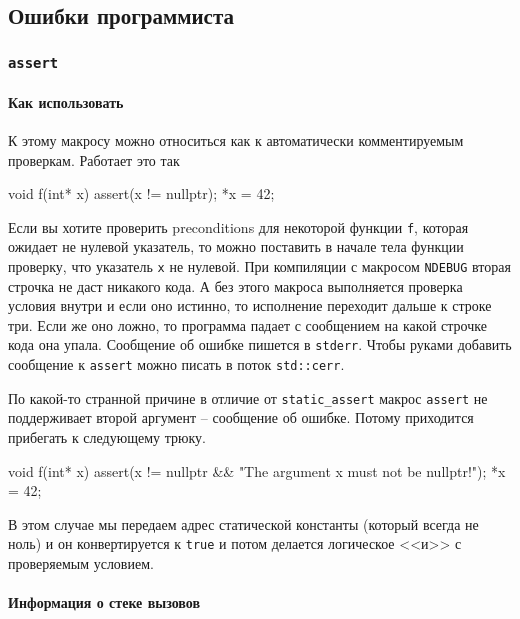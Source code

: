 \subsection{Ошибки программиста}

\subsubsection{\texttt{assert}}

\paragraph{Как использовать}

К этому макросу можно относиться как к автоматически комментируемым проверкам.
Работает это так
\begin{cppcode}
void f(int* x) {
  assert(x != nullptr);
  *x = 42;
}
\end{cppcode}
Если вы хотите проверить preconditions для некоторой функции \verb"f", которая ожидает не нулевой указатель, то можно поставить в начале тела функции проверку, что указатель \verb"x" не нулевой.
При компиляции с макросом \verb"NDEBUG" вторая строчка не даст никакого кода.
А без этого макроса выполняется проверка условия внутри и если оно истинно, то исполнение переходит дальше к строке три.
Если же оно ложно, то программа падает с сообщением на какой строчке кода она упала.
Сообщение об ошибке пишется в \verb"stderr".
Чтобы руками добавить сообщение к \verb"assert" можно писать в поток \verb"std::cerr".

По какой-то странной причине в отличие от \verb"static_assert" макрос \verb"assert" не поддерживает второй аргумент -- сообщение об ошибке.
Потому приходится прибегать к следующему трюку.
\begin{cppcode}
void f(int* x) {
  assert(x != nullptr && "The argument x must not be nullptr!");
  *x = 42;
}
\end{cppcode}
В этом случае мы передаем адрес статической константы (который всегда не ноль) и он конвертируется к \verb"true" и потом делается логическое <<и>> с проверяемым условием.

\paragraph{Информация о стеке вызовов}

